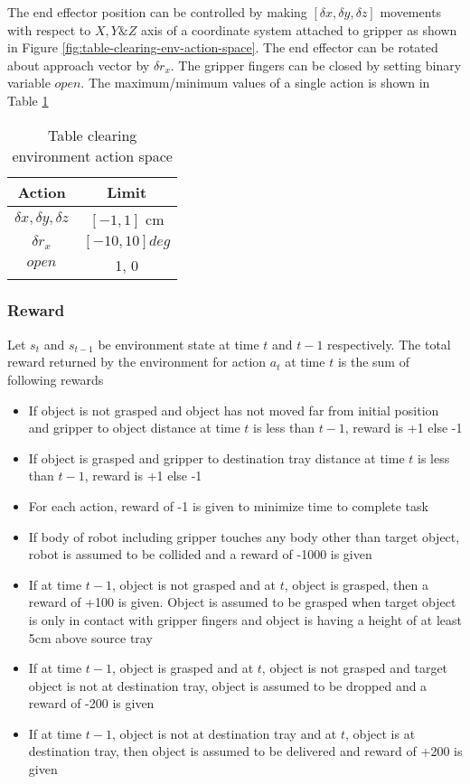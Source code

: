 The end effector position can be controlled by making $[\delta x, \delta y, \delta z]$ movements with respect to $X, Y \& Z$  axis of a coordinate system attached to gripper as shown in Figure \ref{fig:table-clearing-env-action-space}. The end effector can be rotated about approach vector by $\delta r_x$. The gripper fingers can be closed by setting binary variable $open$. The maximum/minimum values of a single action is shown in Table \ref{table:table-clearing-env-action-space}

\begin{table}[H]
	\centering
	\begin{tabular}{|c|c|}
		\hline 
		Action & Limit \\ 
		\hline 
		$\delta x, \delta y, \delta z$ & $[-1, 1]$ cm \\ 
		$\delta r_x$ & $[-10, 10] deg$ \\
		$open$ & {1, 0} \\
		\hline 
	\end{tabular}
	\caption{Table clearing environment action space}
	\label{table:table-clearing-env-action-space}
\end{table}

\subsubsection{Reward}
Let $s_t$ and $s_{t-1}$ be environment state at time $t$ and $t-1$ respectively. The total reward returned by the environment for action $a_t$ at time $t$ is the sum of following rewards

\begin{itemize}
	\item If object is not grasped and object has not moved far from initial position and gripper to object distance at time $t$ is less than $t-1$, reward is +1 else -1
	\item If object is grasped and gripper to destination tray distance at time $t$ is less than $t-1$, reward is +1 else -1
	\item For each action, reward of -1 is given to minimize time to complete task
	\item If body of robot including gripper touches any body other than target object, robot is assumed to be collided and a reward of -1000 is given
	\item If at time $t-1$, object is not grasped and at $t$, object is grasped, then a reward of +100 is given. Object is assumed to be grasped when target object is only in contact with gripper fingers and object is having a height of at least 5cm above source tray
	\item If at time $t-1$, object is grasped and at $t$, object is not grasped and target object is not at destination tray, object is assumed to be dropped and a reward of -200 is given
	\item If at time $t-1$, object is not at destination tray and at $t$, object is at destination tray, then object is assumed to be delivered and reward of +200 is given
\end{itemize}

